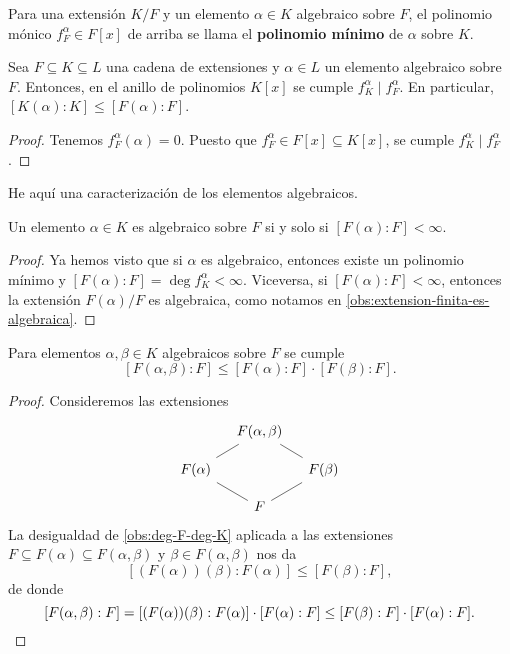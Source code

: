 \begin{definicion}
  Para una extensión $K/F$ y un elemento $\alpha \in K$ algebraico sobre $F$,
  el polinomio mónico $f^\alpha_F \in F [x]$ de arriba se llama el
  \textbf{polinomio mínimo} de $\alpha$ sobre $K$.
\end{definicion}

\begin{proposicion}
  \label{obs:deg-F-deg-K}
  Sea $F \subseteq K \subseteq L$ una cadena de extensiones y $\alpha \in L$ un
  elemento algebraico sobre $F$. Entonces, en el anillo de polinomios $K [x]$ se
  cumple $f^\alpha_K \mid f^\alpha_F$. En particular,
  $[K (\alpha) : K] \le [F (\alpha) : F]$.

  \begin{proof}
    Tenemos $f^\alpha_F (\alpha) = 0$. Puesto que
    $f^\alpha_F \in F [x] \subseteq K [x]$, se cumple
    $f^\alpha_K \mid f^\alpha_F$.
  \end{proof}
\end{proposicion}

He aquí una caracterización de los elementos algebraicos.

\begin{proposicion}
  Un elemento $\alpha \in K$ es algebraico sobre $F$ si y solo si
  $[F (\alpha) : F] < \infty$.

  \begin{proof}
    Ya hemos visto que si $\alpha$ es algebraico, entonces existe un polinomio
    mínimo y $[F (\alpha) : F] = \deg f^\alpha_K < \infty$. Viceversa, si
    $[F (\alpha) : F] < \infty$, entonces la extensión $F (\alpha)/F$ es
    algebraica, como notamos en \ref{obs:extension-finita-es-algebraica}.
  \end{proof}
\end{proposicion}

\begin{proposicion}
  Para elementos $\alpha,\beta\in K$ algebraicos sobre $F$ se cumple
  $$[F (\alpha,\beta) : F] \le [F (\alpha) : F] \cdot [F (\beta) : F].$$

  \begin{proof}
    Consideremos las extensiones
    \[ \begin{tikzcd}[row sep=1em, column sep=1em]
      & F (\alpha,\beta)\ar[-]{dl}\ar[-]{dr} \\
      F (\alpha)\ar[-]{dr} & & F (\beta)\ar[-]{dl} \\
      & F
    \end{tikzcd} \]
    La desigualdad de \ref{obs:deg-F-deg-K} aplicada a las extensiones
    $F \subseteq F (\alpha) \subseteq F (\alpha,\beta)$ y
    $\beta \in F (\alpha,\beta)$ nos da
    $$[(F (\alpha)) (\beta) : F (\alpha)] \le [F (\beta) : F],$$
    de donde
    \[ [F (\alpha,\beta) : F] =
       [(F (\alpha)) (\beta) : F (\alpha)] \cdot [F (\alpha) : F] \le
       [F (\beta) : F] \cdot [F (\alpha) : F]. \qedhere \]
  \end{proof}
\end{proposicion}

